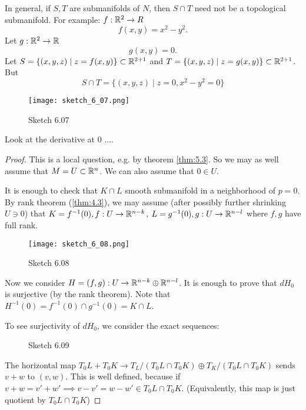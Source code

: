 \begin{remark}
    In general, if \(S,T\) are submanifolds of \(N\), then \(S\cap T\) need not be a topological submanifold.
    For example: \(f:\mathbb{R}^2\to R\)
    \[f(x,y)=x^2-y^2.\]
    Let \(g:\mathbb{R}^2\to \mathbb{R}\) 
    \[g(x,y)=0.\]
    Let \(S=\{(x,y,z)\mid z=f(x,y)\}\subset \mathbb{R}^{2+1}\) and \(T=\{(x,y,z)\mid z=g(x,y)\}\subset \mathbb{R}^{2+1}\).
    But \[S\cap T=\{(x,y,z)\mid z=0,x^2-y^2=0\}\]
    \begin{figure}[H]
        \centering
        \texttt{[image: sketch\_6\_07.png]}
        \caption{Sketch 6.07}
    \end{figure} 
    Look at the derivative at 0 .... %
\end{remark}

\begin{proof}
    This is a local question, e.g. by theorem \ref{thm:5.3}. So we may as well assume that \(M=U\subset \mathbb{R}^n\).
    We can also assume that \(0\in U\).
    
    It is enough to check that \(K\cap L\) smooth submanifold in a neighborhood of \(p=0\). By rank theorem (\ref{thm:4.3}), we may assume 
    (after possibly further shrinking \(U\ni 0\)) that \(K=f^{-1}(0),f:U\to\mathbb{R}^{n-k}\),
    \(L=g^{-1}(0), g:U\to\mathbb{R}^{n-l}\) where \(f,g\) have full rank.

    \begin{figure}[H]
        \centering
        \texttt{[image: sketch\_6\_08.png]}
        \caption{Sketch 6.08}
    \end{figure}
    Now we consider \(H=(f,g):U\to \mathbb{R}^{n-k}\oplus \mathbb{R}^{n-l}\). It is enough to prove that \(dH_0\) is 
    surjective (by the rank theorem). Note that \(H^{-1}(0)=f^{-1}(0)\cap g^{-1}(0)=K\cap L\).

    To see surjectivity of \(dH_0\), we consider the exact sequences: 
    \begin{figure}[H]\label{fig:6.09}
        \centering
        \caption{Sketch 6.09}
    \end{figure}
    The horizontal map \(T_0 L + T_0 K\to T_L/(T_0L\cap T_0K)\oplus T_K/(T_0L\cap T_0K)\) sends \(v+w\)
    to \((v,w)\). This is well defined, because if \(v+w=v'+w'\implies v-v'=w-w'\in T_0L\cap T_0K\). (Equivalently, this map is 
    just quotient by \(T_0L\cap T_0K\)) %


\end{proof}
